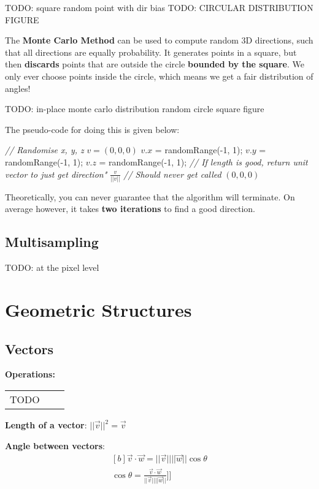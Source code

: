 \documentclass{article}
\begin{document}
TODO: square random point with dir bias
TODO: CIRCULAR DISTRIBUTION FIGURE

The \textbf{Monte Carlo Method} can be used to compute random 3D directions, such that all directions are equally probability. It generates points in a square, but then \textbf{discards} points that are outside the circle \textbf{bounded by the square}. We only ever choose points inside the circle, which means we get a fair distribution of angles! 

TODO: in-place monte carlo distribution random circle square figure

The pseudo-code for doing this is given below:
\begin{algorithmic}[1]
		\STATE \textit{// Randomise x, y, z}
		\STATE $v = (0, 0, 0)$
		\STATE $v.x$ = randomRange(-1, 1);
		\STATE $v.y$ = randomRange(-1, 1);
		\STATE $v.z$ = randomRange(-1, 1);
		\STATE \textit{// If length is good, return unit vector to just get direction"}
			\RETURN $\frac{v}{||v||}		$
		\ENDIF
	\ENDWHILE
	\STATE \textit{// Should never get called}
	\RETURN $(0, 0, 0)$
\end{algorithmic}
Theoretically, you can never guarantee that the algorithm will terminate. On average however, it takes \textbf{two iterations} to find a good direction.

\subsection{Multisampling}

TODO: at the pixel level

\section{Geometric Structures}

\subsection{Vectors}

\textbf{Operations:}
\begin{tabular}{lll}
	TODO & & \\
\end{tabular}

\textbf{Length of a vector}: $||\vec{v}||^2 = \vec{v}$

\textbf{Angle between vectors}:
\begin{equation}
	\begin{aligned}[b]
		\vec{v} \cdot \vec{w} = ||\vec{v}|| ||\vec{w}|| \cos \theta \\
		\cos \theta = \frac{\vec{v} \cdot \vec{w}}{||\vec{v}|| ||\vec{w}||}
	]]
	\end{aligned}	
\end{equation}
\end{document}
